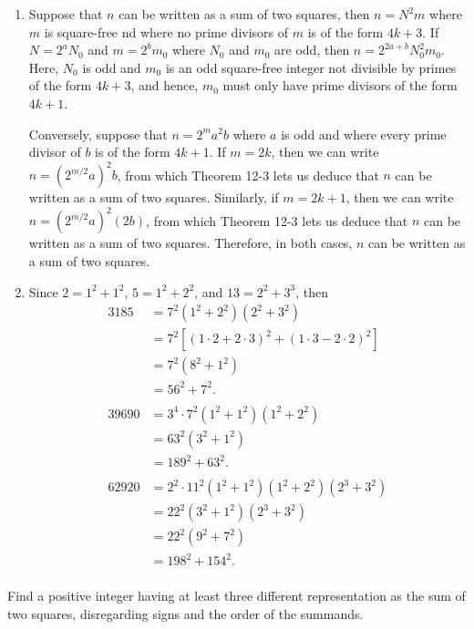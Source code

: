 \begin{solution}
    \begin{enumerate}
        \item Suppose that $n$ can be written as a sum of two squares, then $n = N^2m$ where $m$ is square-free nd where no prime divisors of $m$ is of the form $4k + 3$. If $N = 2^{a}N_0$ and $m = 2^b m_0$ where $N_0$ and $m_0$ are odd, then $n = 2^{2a + b}N_0^2m_0$. Here, $N_0$ is odd and $m_0$ is an odd square-free integer not divisible by primes of the form $4k + 3$, and hence, $m_0$ must only have prime divisors of the form $4k + 1$.
        
        Conversely, suppose that $n = 2^m a^2b$ where $a$ is odd and where every prime divisor of $b$ is of the form $4k + 1$. If $m = 2k$, then we can write $n = (2^{m/2}a)^2b$, from which Theorem 12-3 lets us deduce that $n$ can be written as a sum of two squares. Similarly, if $m = 2k + 1$, then we can write $n = (2^{m/2}a)^2(2b)$, from which Theorem 12-3 lets us deduce that $n$ can be written as a sum of two squares. Therefore, in both cases, $n$ can be written as a sum of two squares.
        \item Since $2 = 1^2 + 1^2$, $5 = 1^2 + 2^2$, and $13 = 2^2 + 3^3$, then
        \begin{align*}
            3185 &= 7^2(1^2 + 2^2) (2^2 + 3^2) \\
            &= 7^2[(1\cdot 2 + 2\cdot 3)^2 + (1 \cdot 3 - 2\cdot 2)^2] \\
            &= 7^2 (8^2 + 1^2) \\
            &= 56^2 + 7^2. \\
            \\
            39690 &= 3^4\cdot 7^2(1^2 + 1^2)(1^2 + 2^2) \\
            &= 63^2(3^2 + 1^2) \\
            &= 189^2 + 63^2. \\
            \\
            62920 &= 2^2\cdot 11^2 (1^2 + 1^2)(1^2 + 2^2)(2^3 + 3^2) \\
            &= 22^2(3^2 + 1^2)(2^3 + 3^2) \\
            &= 22^2(9^2 + 7^2) \\
            &= 198^2 + 154^2. \\
        \end{align*}
    \end{enumerate}
\end{solution}

\begin{exercise}
    Find a positive integer having at least three different representation as the sum of two squares, disregarding signs and the order of the summands.  \\
\end{exercise}

